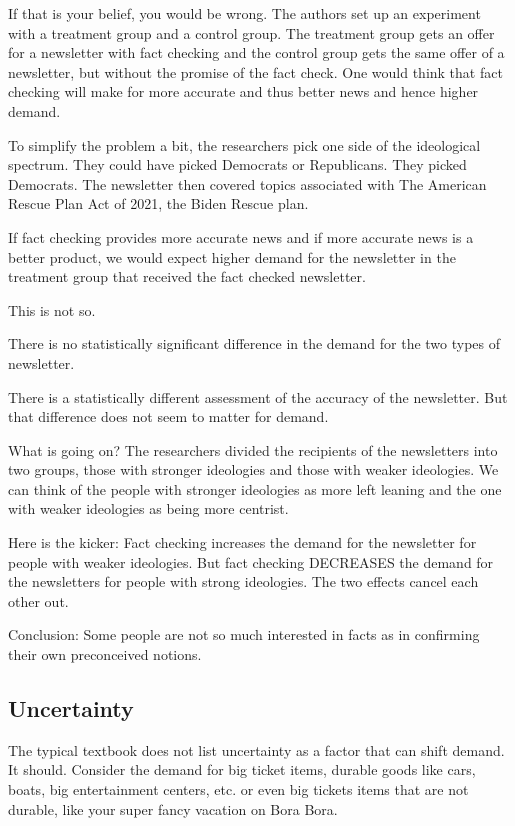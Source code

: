 \documentclass[
]{book}
\begin{document}
If that is your belief, you would be wrong.
The authors set up an experiment with a treatment group and a control group. The treatment group gets an offer for a newsletter with fact checking and the control group gets the same offer of a newsletter, but without the promise of the fact check. One would think that fact checking will make for more accurate and thus better news and hence higher demand.

To simplify the problem a bit, the researchers pick one side of the ideological spectrum. They could have picked Democrats or Republicans. They picked Democrats. The newsletter then covered topics associated with The American Rescue Plan Act of 2021, the Biden Rescue plan.

If fact checking provides more accurate news and if more accurate news is a better product, we would expect higher demand for the newsletter in the treatment group that received the fact checked newsletter.

This is not so.

There is no statistically significant difference in the demand for the two types of newsletter.

There is a statistically different assessment of the accuracy of the newsletter. But that difference does not seem to matter for demand.

What is going on? The researchers divided the recipients of the newsletters into two groups, those with stronger ideologies and those with weaker ideologies. We can think of the people with stronger ideologies as more left leaning and the one with weaker ideologies as being more centrist.

Here is the kicker: Fact checking increases the demand for the newsletter for people with weaker ideologies. But fact checking DECREASES the demand for the newsletters for people with strong ideologies. The two effects cancel each other out.

Conclusion: Some people are not so much interested in facts as in confirming their own preconceived notions.

\hypertarget{uncertainty}{%
\subsection{Uncertainty}\label{uncertainty}}

The typical textbook does not list uncertainty as a factor that can shift demand. It should. Consider the demand for big ticket items, durable goods like cars, boats, big entertainment centers, etc. or even big tickets items that are not durable, like your super fancy vacation on Bora Bora.
\end{document}
